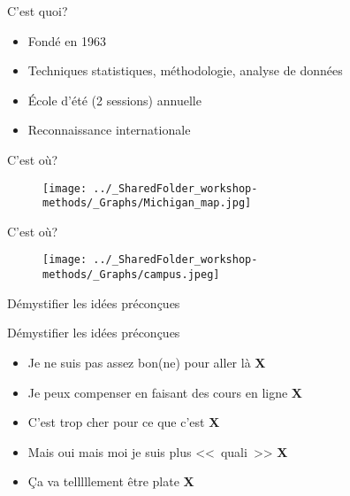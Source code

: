\documentclass{beamer}
\begin{document}
\begin{frame}{C'est quoi?}
\begin{itemize}
    \item Fondé en 1963 
    \item Techniques statistiques, méthodologie, analyse de données
    \item École d'été (2 sessions) annuelle
    \item Reconnaissance internationale 
\end{itemize}
\end{frame}

\begin{frame}{C'est où?}
\begin{figure}
    \centering
    \texttt{[image: ../\_SharedFolder\_workshop-methods/\_Graphs/Michigan\_map.jpg]}
    \label{fig:my_label1}
\end{figure}
\end{frame}

\begin{frame}{C'est où?}
\begin{figure}
    \centering
    \texttt{[image: ../\_SharedFolder\_workshop-methods/\_Graphs/campus.jpeg]}
    \label{fig:my_label2}
\end{figure}
\end{frame}


\begin{frame}
     \begin{center}
          \Huge Démystifier les idées préconçues 
      \end{center}
\end{frame}


\begin{frame}{Démystifier les idées préconçues}
\begin{itemize}
    \item Je ne suis pas assez bon(ne) pour aller là \Large\textbf{\color{red}X}
    \normalsize\item<3-> Je peux compenser en faisant des cours en ligne \Large\textbf{\color{red}X}
    \normalsize\item<5-> C'est trop cher pour ce que c'est \Large\textbf{\color{red}X}
    \normalsize\item<7-> Mais oui mais moi je suis plus <<~quali~>> \Large\textbf{\color{red}X}
     \normalsize\item<9-> Ça va telllllement être plate \Large\textbf{\color{red}X}
\end{itemize}
\end{frame}
\end{document}
